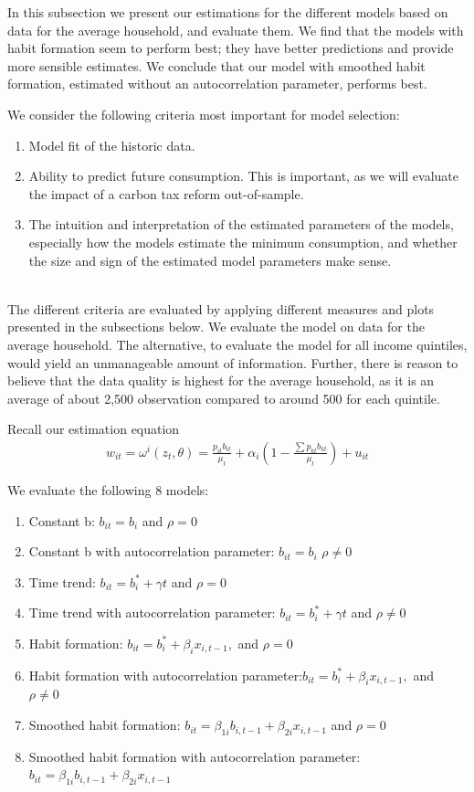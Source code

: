 In this subsection we present our estimations for the different models based on data for the average household, and evaluate them. We find that the models with habit formation seem to perform best; they have better predictions and provide more sensible estimates. We conclude that our model with smoothed habit formation, estimated without an autocorrelation parameter, performs best.

We consider the following criteria most important for model selection:
\begin{enumerate}
    \item{} Model fit of the historic data.
    \item{} Ability to predict future consumption. This is important, as we will evaluate the impact of a carbon tax reform out-of-sample. 
    \item{} The intuition and interpretation of the estimated parameters of the models, especially how the models estimate the minimum consumption, and whether the size and sign of the estimated model parameters make sense.
\end{enumerate}
\\

The different criteria are evaluated by applying different measures and plots presented in the subsections below. We evaluate the model on data for the average household. The alternative, to evaluate the model for all income quintiles, would yield an unmanageable amount of information. Further, there is reason to believe that the data quality is highest for the average household, as it is an average of about 2,500 observation compared to around 500 for each quintile. 


Recall our estimation equation
\begin{align}
    w_{it} = \omega^i(z_t,\theta) = \frac{p_{it} b_{it}}{\mu_t} + \alpha_i \left( 1-\frac{\sum p_{kt}b_{kt}}{\mu_t}\right)+ u_{it}
\end{align}

We evaluate the following 8 models:
\begin{enumerate}[label={(\arabic*)}]
    \item Constant b: $b_{it} = b_i$ and $\rho=0$
    \item Constant b with autocorrelation parameter: $b_{it} = b_i$ $\rho \neq 0$
    \item Time trend: $b_{it} = b_i^* + \gamma t$ and $\rho=0$
    \item Time trend with autocorrelation parameter: $b_{it} = b_i^* + \gamma t$ and $\rho \neq 0$
    \item Habit formation: $b_{it} = b_i^* + \beta_i x_{i,t-1},$ and $\rho=0$
    \item Habit formation with autocorrelation parameter:$b_{it} = b_i^* + \beta_i x_{i,t-1},$ and $\rho \neq0$
    \item Smoothed habit formation: $ b_{it} = \beta_{1i} b_{i,t-1}  + \beta_{2i} x_{i,t-1}$ and $\rho=0$
    \item Smoothed habit formation with autocorrelation parameter: $ b_{it} = \beta_{1i} b_{i,t-1}  + \beta_{2i} x_{i,t-1}$ 
\end{enumerate}

